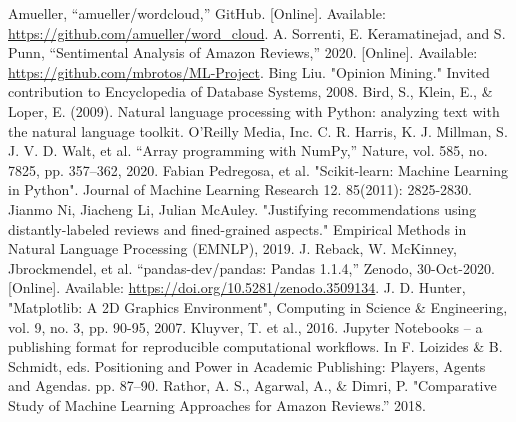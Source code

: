 \documentclass[conference , 11pt]{IEEEtran}
\begin{document}
\begin{thebibliography}{00}
 Amueller, “amueller/wordcloud,” GitHub. [Online]. Available: \url{https://github.com/amueller/word_cloud}.
 A. Sorrenti, E. Keramatinejad, and S. Punn, “Sentimental Analysis of Amazon Reviews,” 2020. [Online]. Available: \url{https://github.com/mbrotos/ML-Project}. 
 Bing Liu. "Opinion Mining." Invited contribution to Encyclopedia of Database Systems, 2008.
 Bird, S., Klein, E., \& Loper, E. (2009). Natural language processing with Python: analyzing text with the natural language toolkit. O'Reilly Media, Inc.
 C. R. Harris, K. J. Millman, S. J. V. D. Walt, et al. “Array programming with NumPy,” Nature, vol. 585, no. 7825, pp. 357–362, 2020. 
 Fabian Pedregosa, et al. "Scikit-learn: Machine Learning in Python". Journal of Machine Learning Research 12. 85(2011): 2825-2830.
 Jianmo Ni, Jiacheng Li, Julian McAuley. "Justifying recommendations using distantly-labeled reviews and fined-grained aspects." Empirical Methods in Natural Language Processing (EMNLP), 2019. 
 J. Reback, W. McKinney, Jbrockmendel, et al. “pandas-dev/pandas: Pandas 1.1.4,” Zenodo, 30-Oct-2020. [Online]. Available: \url{https://doi.org/10.5281/zenodo.3509134}.
 J. D. Hunter, "Matplotlib: A 2D Graphics Environment", Computing in Science \& Engineering, vol. 9, no. 3, pp. 90-95, 2007.
 Kluyver, T. et al., 2016. Jupyter Notebooks – a publishing format for reproducible computational workflows. In F. Loizides \& B. Schmidt, eds. Positioning and Power in Academic Publishing: Players, Agents and Agendas. pp. 87–90.
 Rathor, A. S., Agarwal, A., \& Dimri, P. "Comparative Study of Machine Learning Approaches for Amazon Reviews.” 2018.
\end{thebibliography}
\end{document}
